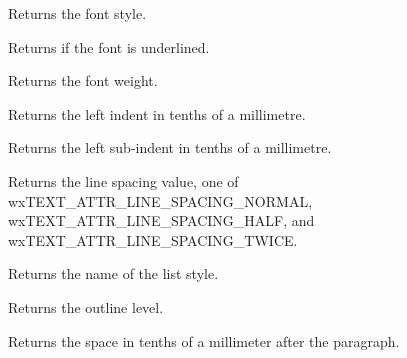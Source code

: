 
Returns the font style.

\label{wxrichtextattrgetfontunderlined}


Returns \true if the font is underlined.

\label{wxrichtextattrgetfontweight}


Returns the font weight.

\label{wxrichtextattrgetleftindent}


Returns the left indent in tenths of a millimetre.

\label{wxrichtextattrgetleftsubindent}


Returns the left sub-indent in tenths of a millimetre.

\label{wxrichtextattrgetlinespacing}


Returns the line spacing value, one of wxTEXT\_ATTR\_LINE\_SPACING\_NORMAL,
wxTEXT\_ATTR\_LINE\_SPACING\_HALF, and wxTEXT\_ATTR\_LINE\_SPACING\_TWICE.

\label{wxrichtextattrgetliststylename}


Returns the name of the list style.

\label{wxrichtextattrgetoutlinelevel}


Returns the outline level.

\label{wxrichtextattrgetparagraphspacingafter}


Returns the space in tenths of a millimeter after the paragraph.

